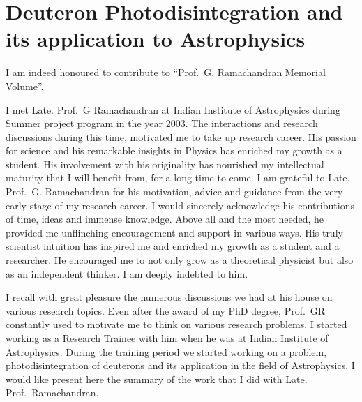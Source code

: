 \chapter[Deuteron Photodisintegration and its application to Astrophysics]{Deuteron Photodisintegration and its application to Astrophysics}\label{chap34}



I am indeed honoured to contribute to ``Prof.\ G. Ramachandran Memorial Volume''. 

I met Late. Prof.\ G Ramachandran at Indian Institute of Astrophysics during Summer project program in the year 2003. The interactions and research discussions during this time, motivated me to take up research career. His passion for science and his remarkable insights in Physics has enriched my growth as a student. His involvement with his originality has nourished my intellectual maturity that I will benefit from, for a long time to come. I am grateful to Late. Prof.\ G. Ramachandran for his motivation, advice and guidance from the very early stage of my research career. I would sincerely acknowledge his contributions of time, ideas and immense knowledge. Above all and the most needed, he provided me unflinching encouragement and support in various ways. His truly scientist intuition has inspired me and enriched my growth as a student and a researcher. He encouraged me to not only grow as a theoretical physicist but also as an independent thinker. I am deeply indebted to him.

I  recall with great pleasure the numerous discussions we had at his house on various research topics. Even after the award of my PhD degree, Prof.\ GR constantly used to motivate me to think on various research problems. I started working as a Research Trainee with him when he was at Indian Institute of Astrophysics. During the training period we started working on a problem, photodisintegration of deuterons and its application in the field of Astrophysics. I would like present here the summary of the work that I did with Late. Prof.\ Ramachandran.

